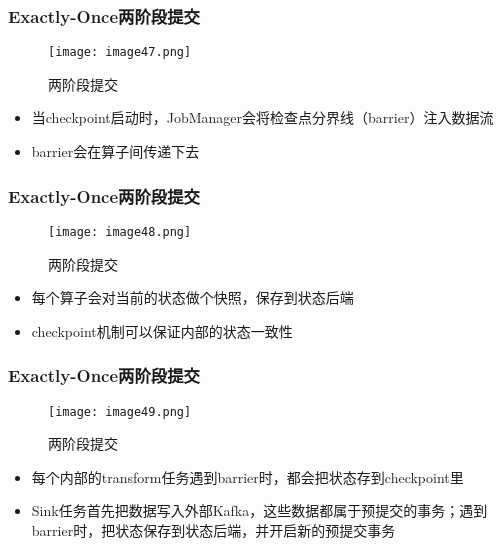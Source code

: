 \documentclass{beamer}
\begin{document}
  \begin{frame}
      \frametitle{Exactly-Once两阶段提交}
      
      \begin{figure}
      	\centering
      	\texttt{[image: image47.png]}
      	\caption{两阶段提交}
      \end{figure}
  
      \begin{itemize}
          \item 当checkpoint启动时，JobManager会将检查点分界线（barrier）注入数据流
          \item barrier会在算子间传递下去
      \end{itemize}
  
  \end{frame}

  \begin{frame}
      \frametitle{Exactly-Once两阶段提交}
      
      \begin{figure}
      	\centering
      	\texttt{[image: image48.png]}
      	\caption{两阶段提交}
      \end{figure}
  
      \begin{itemize}
          \item 每个算子会对当前的状态做个快照，保存到状态后端
          \item checkpoint机制可以保证内部的状态一致性
      \end{itemize}
  
  \end{frame}

  \begin{frame}
      \frametitle{Exactly-Once两阶段提交}
      
      \begin{figure}
      	\centering
      	\texttt{[image: image49.png]}
      	\caption{两阶段提交}
      \end{figure}
  
      \begin{itemize}
          \item 每个内部的transform任务遇到barrier时，都会把状态存到checkpoint里
          \item Sink任务首先把数据写入外部Kafka，这些数据都属于预提交的事务；遇到barrier时，把状态保存到状态后端，并开启新的预提交事务
      \end{itemize}
  
  \end{frame}
\end{document}
